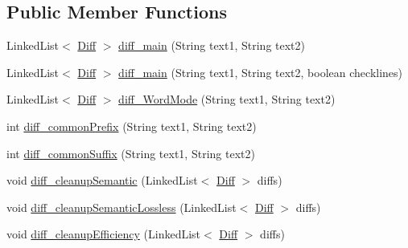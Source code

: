 \subsection*{Public Member Functions}
\begin{DoxyCompactItemize}
\item 
Linked\+List$<$ \hyperlink{classname_1_1fraser_1_1neil_1_1plaintext_1_1diff__match__patch_1_1Diff}{Diff} $>$ \hyperlink{classname_1_1fraser_1_1neil_1_1plaintext_1_1diff__match__patch_adf3f4abb235a32713138ea410870df89}{diff\+\_\+main} (String text1, String text2)
\item 
Linked\+List$<$ \hyperlink{classname_1_1fraser_1_1neil_1_1plaintext_1_1diff__match__patch_1_1Diff}{Diff} $>$ \hyperlink{classname_1_1fraser_1_1neil_1_1plaintext_1_1diff__match__patch_ad516b77da1c9614207913cc5a52d8854}{diff\+\_\+main} (String text1, String text2, boolean checklines)
\item 
Linked\+List$<$ \hyperlink{classname_1_1fraser_1_1neil_1_1plaintext_1_1diff__match__patch_1_1Diff}{Diff} $>$ \hyperlink{classname_1_1fraser_1_1neil_1_1plaintext_1_1diff__match__patch_a874bdc809e7abfef0a4df220fd47aeb7}{diff\+\_\+\+Word\+Mode} (String text1, String text2)
\item 
int \hyperlink{classname_1_1fraser_1_1neil_1_1plaintext_1_1diff__match__patch_a85a2fed2b542f3254adaf23bf07d5326}{diff\+\_\+common\+Prefix} (String text1, String text2)
\item 
int \hyperlink{classname_1_1fraser_1_1neil_1_1plaintext_1_1diff__match__patch_af7a8bdb9ca2417f289b95c03b13885fa}{diff\+\_\+common\+Suffix} (String text1, String text2)
\item 
void \hyperlink{classname_1_1fraser_1_1neil_1_1plaintext_1_1diff__match__patch_a5dbbff77c5f9deb0b56f94473aba613e}{diff\+\_\+cleanup\+Semantic} (Linked\+List$<$ \hyperlink{classname_1_1fraser_1_1neil_1_1plaintext_1_1diff__match__patch_1_1Diff}{Diff} $>$ diffs)
\item 
void \hyperlink{classname_1_1fraser_1_1neil_1_1plaintext_1_1diff__match__patch_a72b6ba64ba9c720dc15e07945cc39326}{diff\+\_\+cleanup\+Semantic\+Lossless} (Linked\+List$<$ \hyperlink{classname_1_1fraser_1_1neil_1_1plaintext_1_1diff__match__patch_1_1Diff}{Diff} $>$ diffs)
\item 
void \hyperlink{classname_1_1fraser_1_1neil_1_1plaintext_1_1diff__match__patch_a70f893fa6b003227faa5826de7ff03e4}{diff\+\_\+cleanup\+Efficiency} (Linked\+List$<$ \hyperlink{classname_1_1fraser_1_1neil_1_1plaintext_1_1diff__match__patch_1_1Diff}{Diff} $>$ diffs)
\item 

\end{DoxyCompactItemize}
